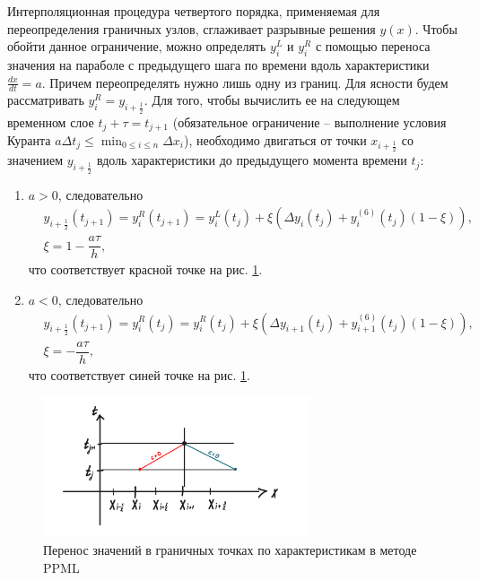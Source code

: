 \documentclass[12pt,a4paper]{article}
\newcommand{\picref}[1]{рис. \ref{#1}}
\newcommand{\half}{\frac{1}{2}}
\begin{document}
    Интерполяционная процедура четвертого порядка, применяемая для переопределения граничных узлов, сглаживает разрывные решения $y(x)$. Чтобы обойти данное ограничение, можно определять $ y_i^L $ и $ y_i^R $ с помощью переноса значения на параболе с предыдущего шага по времени вдоль характеристики $ \frac{dx}{dt} = a $. Причем переопределять нужно лишь одну из границ. Для ясности  будем рассматривать $y_i^R = y_{i+\half}$. Для того, чтобы вычислить ее на следующем временном слое $ t_j + \tau = t_{j+1}$ (обязательное ограничение -- выполнение условия Куранта $ a \Delta t_j \leq \min_{0 \leq i \leq n}\Delta x_i $), необходимо двигаться от точки $ x_{i+\half} $ со значением $ y_{i+\half} $ вдоль характеристики до предыдущего момента времени $ t_j $:
    \begin{enumerate}
        \item $ a > 0 $, следовательно
        \begin{equation}
            \label{ppml_boundary}
            \begin{split}
                &y_{i+\half}(t_{j+1}) = y_i^R(t_{j+1}) = y_i^L(t_j) + \xi(\Delta y_i(t_j) + y_i^{(6)}(t_j)(1-\xi)), \\[0.7em]
                &\xi = 1 -  \dfrac{a \tau}{h},
            \end{split}
        \end{equation}
        \noindent что соответствует красной точке на \picref{fig:ppml_visual}.

        \item $ a < 0 $, следовательно
        \[
            \begin{split}
                &y_{i+\half}(t_{j+1}) = y_i^R(t_j) = y_i^R(t_j) + \xi(\Delta y_{i+1}(t_j) + y_{i+1}^{(6)}(t_j)(1-\xi)), \\[0.7em]
                &\xi = -\dfrac{a \tau}{h},
            \end{split}  
        \]
        \noindent что соответствует синей точке на \picref{fig:ppml_visual}.
    \end{enumerate}

    \begin{figure}[h]
        \centering
        \includegraphics[width=0.7\textwidth]{ppml_visual.jpeg}
        \caption{Перенос значений в граничных точках по характеристикам в методе PPML}
        \label{fig:ppml_visual}
    \end{figure}
\end{document}
